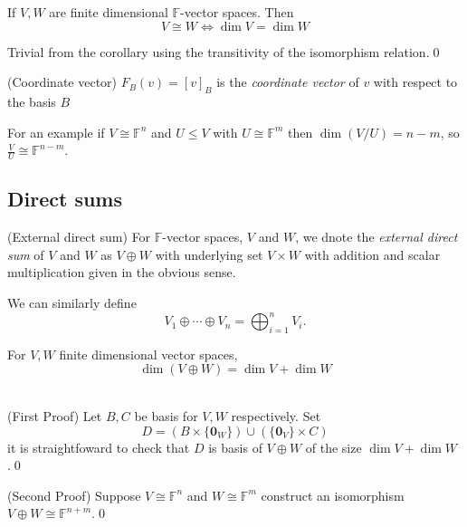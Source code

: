 \documentclass{article}
\newcommand{\F}{\mathbb{F}}
\begin{document}
  \begin{corollary}
    If $ V,W $ are finite dimensional $ \F $-vector spaces. Then
    \[
      V\cong W\iff \dim V=\dim W
    \]
  \end{corollary}
  \pf Trivial from the corollary using the transitivity of the isomorphism relation.\qed
\begin{definition}
	(Coordinate vector) $ F_B(v)=[v]_B $ is the \textit{coordinate vector} of $ v $ with respect to the basis $ B $
\end{definition}
For an example if $ V\cong \F^n $ and $ U\le V $ with $ U\cong \F^m $ then $ \dim(V/U)=n-m $, so $ \frac VU\cong \F^{n-m} $.
\subsection{Direct sums}
\begin{definition}
	(External direct sum) For $ \F $-vector spaces, $ V $ and $ W $, we dnote the \textit{external direct sum} of $ V $ and $ W $ as $ V\oplus W $ with underlying set $ V\times W $ with addition and scalar multiplication given in the obvious sense.
\end{definition}
We can similarly define
\[
	V_1\oplus \cdots \oplus V_n=\bigoplus_{i=1}^nV_i.
\]
\begin{lemma}
  For $ V,W $ finite dimensional vector spaces,
  \[
    \dim(V\oplus W)=\dim V+\dim W
  \]
\end{lemma}
\pf\\(First Proof) Let $ B,C $ be basis for $ V,W $ respectively. Set
\[
	D=(B\times\{\mathbf 0_W\})\cup (\{\mathbf 0_V\}\times C)
\]
it is straightfoward to check that $ D $ is basis of $ V\oplus W $ of the size $ \dim V + \dim W $.\qed\par
(Second Proof) Suppose $ V\cong \F^n $ and $ W\cong \F^m $ construct an isomorphism $ V\oplus W\cong\F^{n+m} $.\qed
\end{document}

